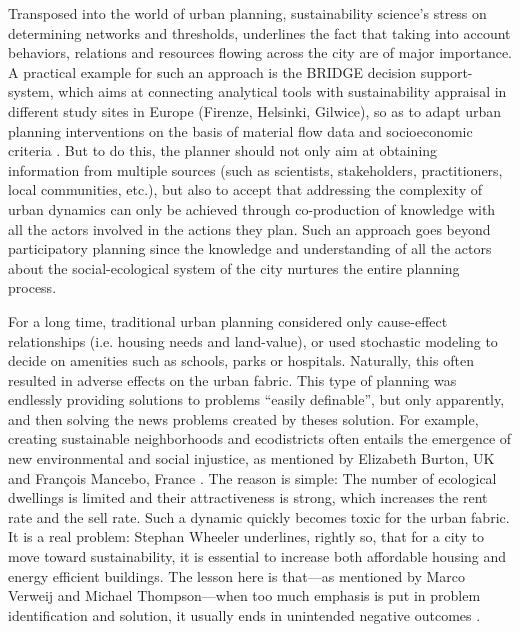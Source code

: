 \documentclass[10pt,a4paper]{article}
\begin{document}
\begin{multicols}{2}
Transposed into the world of urban planning, sustainability science's stress on determining networks and thresholds, underlines the fact that taking into account behaviors, relations and resources flowing across the city are of major importance. A practical example for such an approach is the BRIDGE decision support-system, which aims at connecting analytical tools with sustainability appraisal in different study sites in Europe (Firenze, Helsinki, Gilwice), so as to adapt urban planning interventions on the basis of material flow data and socioeconomic criteria \citep{r104, r105}. But to do this, the planner should not only aim at obtaining information from multiple sources (such as scientists, stakeholders, practitioners, local communities, etc.), but also to accept that addressing the complexity of urban dynamics can only be achieved through co-production of knowledge with all the actors involved in the actions they plan. Such an approach goes beyond participatory planning since the knowledge and understanding of all the actors about the social-ecological system of the city nurtures the entire planning process.

For a long time, traditional urban planning considered only cause-effect relationships (i.e. housing needs and land-value), or used stochastic modeling to decide on amenities such as schools, parks or hospitals. Naturally, this often resulted in adverse effects on the urban fabric. This type of planning was endlessly providing solutions to problems ``easily definable'', but only apparently, and then solving the news problems created by theses solution. For example, creating sustainable neighborhoods and ecodistricts often entails the emergence of new environmental and social injustice, as mentioned by Elizabeth Burton, UK \citep{r106} and François Mancebo, France \citep{r107}. The reason is simple: The number of ecological dwellings is limited and their attractiveness is strong, which increases the rent rate and the sell rate. Such a dynamic quickly becomes toxic for the urban fabric. It is a real problem: Stephan Wheeler \citep{r108} underlines, rightly so, that for a city to move toward sustainability, it is essential to increase both affordable housing and energy efficient buildings. The lesson here is that---as mentioned by Marco Verweij and Michael Thompson---when too much emphasis is put in problem identification and solution, it usually ends in unintended negative outcomes \citep{r109}.


\end{multicols}
\end{document}
